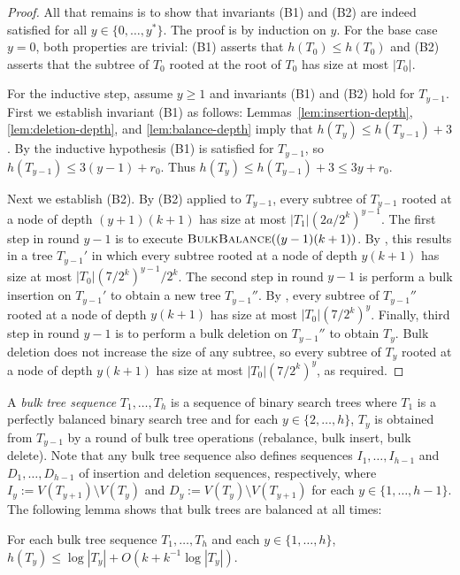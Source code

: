 \documentclass[kpfonts]{patmorin}
\begin{document}
\begin{proof}
  All that remains is to show that invariants (B1) and (B2) are indeed satisfied for all $y\in\{0,\ldots,y^*\}$.  The proof is by induction on $y$.  For the base case $y=0$, both properties are trivial: (B1) asserts that $h(T_0)\le h(T_0)$ and (B2) asserts that the subtree of $T_0$ rooted at the root of $T_0$ has size at most $|T_0|$.

  For the inductive step, assume $y\ge 1$ and invariants (B1) and (B2) hold for $T_{y-1}$.  First we establish invariant (B1) as follows:
  Lemmas~\ref{lem:insertion-depth}, \ref{lem:deletion-depth}, and \ref{lem:balance-depth} imply that $h(T_y)\le h(T_{y-1})+3$.  
  By the inductive hypothesis (B1) is satisfied for $T_{y-1}$, so $h(T_{y-1})\le 3(y-1) + r_0$.  Thus $h(T_y)\le h(T_{y-1}) + 3 \le 3y+r_0$.
  
  Next we establish (B2).  By (B2) applied to $T_{y-1}$, every subtree of $T_{y-1}$ rooted at a node of depth $(y+1)(k+1)$ has size at most $|T_{1}|(2a/2^k)^{y-1}$.  The first step in round $y-1$ is to execute $\textsc{BulkBalance}((y-1)(k+1))$.  By , this results in a tree $T_{y-1}'$ in which every subtree rooted at a node of depth $y(k+1)$ has size at most $|T_{0}|(7/2^k)^{y-1}/2^k$.  The second step in round $y-1$ is perform a bulk insertion on $T_{y-1}'$ to obtain a new tree $T_{y-1}''$.  
  By , every subtree of $T_{y-1}''$ rooted at a node of depth $y(k+1)$ has size at most $|T_{0}|(7/2^k)^{y}$.  Finally, third step in round $y-1$ is to perform a bulk deletion on $T_{y-1}''$ to obtain $T_{y}$.  Bulk deletion does not increase the size of any subtree, so every subtree of $T_{y}$ rooted at a node of depth $y(k+1)$ has size at most $|T_{0}|(7/2^k)^{y}$, as required.
\end{proof}

A \emph{bulk tree sequence} $T_1,\ldots,T_h$ is a sequence of binary search trees where $T_1$ is a perfectly balanced binary search tree and for each $y\in\{2,\ldots,h\}$, $T_y$ is obtained from $T_{y-1}$ by a round of bulk tree operations (rebalance, bulk insert, bulk delete).  Note that any bulk tree sequence also defines sequences $I_1,\ldots,I_{h-1}$ and $D_1,\ldots,D_{h-1}$ of insertion and deletion sequences, respectively, where $I_y:=V(T_{y+1})\setminus V(T_y)$ and $D_y:=V(T_{y})\setminus V(T_{y+1})$ for each $y\in\{1,\ldots,h-1\}$. 
The following lemma shows that bulk trees are balanced at all times:
\begin{lem}
  For each bulk tree sequence $T_1,\ldots,T_h$ and each $y\in\{1,\ldots,h\}$,  $h(T_y)\le \log|T_y| + O(k+k^{-1}\log|T_y|)$.
\end{lem}
\end{document}
